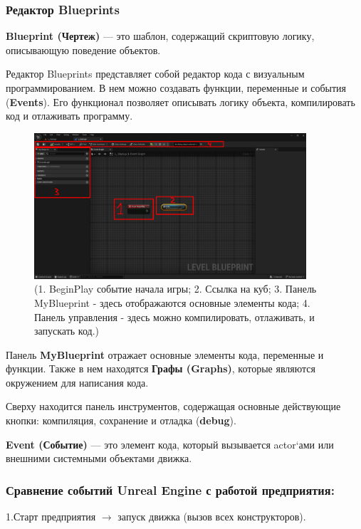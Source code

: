 \newpage
\subsubsection{Редактор Blueprints}

\textbf{Blueprint (Чертеж)} — это шаблон, содержащий скриптовую логику, описывающую поведение объектов.

Редактор Blueprints представляет собой редактор кода с визуальным программированием. В нем можно создавать функции, переменные и события (\textbf{Events}). Его функционал позволяет описывать логику объекта, компилировать код и отлаживать программу.

\begin{figure}[h]
    \centering
    \includegraphics[width=0.9\textwidth]{Lections/BlueprintOverview.png}
    \caption{(1. BeginPlay событие начала игры; 2. Ссылка на куб; 3. Панель MyBlueprint - здесь отображаются основные элементы кода; 4. Панель управления - здесь можно компилировать, отлаживать, и запускать код.)}
\end{figure}

Панель \textbf{MyBlueprint} отражает основные элементы кода, переменные и функции. Также в нем находятся \textbf{Графы (Graphs)}, которые являются окружением для написания кода.

Сверху находится панель инструментов, содержащая основные действующие кнопки: компиляция, сохранение и отладка (\textbf{debug}).

\textbf{Event (Событие)} — это элемент кода, который вызывается actor`ами или внешними системными объектами движка.

\subsubsection*{Сравнение событий Unreal Engine с работой предприятия:}

1.\hspace{1em}Старт предприятия $\rightarrow$ запуск движка (вызов всех конструкторов).

